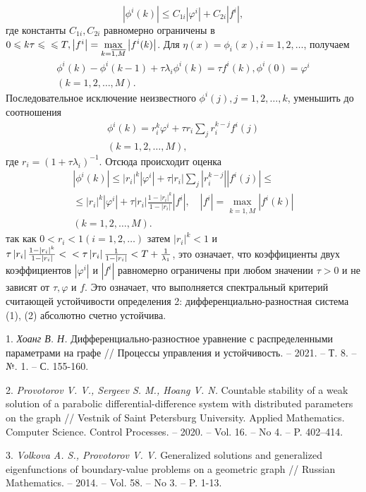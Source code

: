 $$
|\phi^{i}(k)| \leqslant C_{1i}\left|\varphi^{i}\right|+C_{2i}\left|f^{i}\right|,
$$
где константы $C_{1i}, C_{2i}$ равномерно ограничены в $0 \leqslant k \tau \leqslant\\ \leqslant T,\left|f^{i} \right|=\displaystyle\max_{k=\overline{1, M}}\left|f^{i}(k)\right|$.
Для $\eta(x)=\phi_{i}(x), i=1,2, \ldots$, получаем
$$
\begin{gathered}
	\phi^{i}(k)-\phi^{i}(k-1)+\tau \lambda_{i} \phi^{i}(k)=\tau f^{i}(k), \phi^{i}(0)=\varphi^{i} \\
	(k=1,2, \ldots, M).
\end{gathered}
$$
Последовательное исключение  неизвестного $\phi^{i}(j), j=1,2, \ldots, k$, уменьшить до соотношения
$$
\begin{gathered}
	\phi^{i}(k)=r_{i}^{k} \varphi^{i}+\tau r_{i} \sum_{j} r_{i}^{k-j} f^{i}(j) \\
	(k=1,2, \ldots, M),
\end{gathered}
$$
где $r_{i}=\left(1+\tau \lambda_{i}\right)^{-1}$. Отсюда происходит оценка
$$
\begin{gathered}
	\left|\phi^{i}(k)\right| \leqslant\left|r_{i}\right|^{k}\left|\varphi^{i}\right|+\tau\left|r_{i}\right| \sum_{j}\left|r_{i}^{k-j}\right|\left|f^{i}(j)\right| \leqslant \\
	\leqslant\left|r_{i}\right|^{k}\left|\varphi^{i}\right|+\tau\left|r_{i}\right| \frac{1-\left|r_{i}\right|^{k}}{1-\left|r_{i}\right|}\left|f^{i}\right|, \quad\left|f^{i}\right|=\displaystyle\max_{k=\overline{1, M}}\left|f^{i}(k)\right| \\
	(k=1,2, \ldots, M) .
\end{gathered}
$$
так как $0<r_{i}<1(i=1,2, \ldots)$ затем $\left|r_{i}\right|^{k}<1$ и $\tau\left|r_{i}\right| \frac{1-\left|r_{i}\right|^{k}}{1-\left|r_{i}\right|}<\\<\tau\left|r_{i}\right| \frac{1}{1-\left|r_{i}\right|}<T+\frac{1}{\lambda_{1}}$, это означает, что коэффициенты двух коэффициентов  $\left|\varphi^{i}\right|$ и $\left|f^{i}\right|$ равномерно ограничены при любом значении $\tau>0$ и не зависят от $\tau, \varphi$ и $f$. Это означает, что выполняется спектральный критерий считающей устойчивости определения 2: дифференциально-разностная система (1), (2) абсолютно счетно устойчива.

\litlist

1. {\it Хоанг В. Н.} Дифференциально-разностное уравнение  с распределенными параметрами на графе // Процессы управления и устойчивость. – 2021. – Т. 8. – №. 1. – С. 155-160.


2. {\it Provotorov V. V., Sergeev S. M., Hoang V. N.} Countable stability of a weak solution of a parabolic differential-difference system with distributed parameters on the graph // Vestnik of Saint Petersburg University. Applied Mathematics. Computer Science. Control Processes. – 2020. – Vol. 16. – No 4. – P. 402–414.

3. {\it Volkova A. S., Provotorov V. V.} Generalized solutions and generalized eigenfunctions of boundary-value problems on a geometric graph // Russian Mathematics. – 2014. – Vol. 58. – No 3. – P. 1-13.
